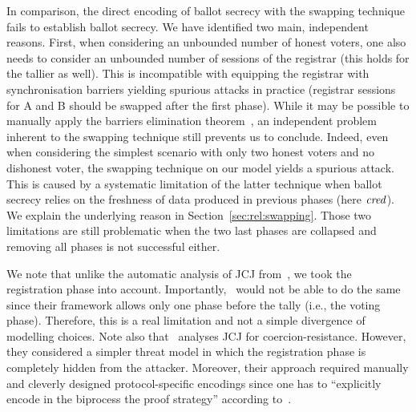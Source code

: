 In comparison, the direct encoding of ballot secrecy with the swapping technique~\cite{vote-CSF16} fails to establish ballot secrecy.
We have identified two main, independent reasons. 
First, when considering an unbounded number of honest voters, one also needs to consider an unbounded number of sessions of the registrar (this holds for the tallier as well).
This is incompatible with equipping the registrar with synchronisation
barriers %
yielding spurious attacks in practice (registrar sessions for A and B should be swapped after the first phase).
While it may be possible to manually apply the barriers elimination theorem~\cite{vote-CSF16}, an independent problem inherent to
the swapping technique still prevents us to conclude.
Indeed, even when considering the simplest scenario with only two honest voters and no dishonest voter,
the swapping technique on our model yields a spurious attack. This is caused by a systematic limitation of the latter technique when ballot secrecy relies
on the freshness of data produced in previous phases (here $\mathit{cred}$).
We explain the underlying reason in Section~\ref{sec:rel:swapping}. Those two limitations are still problematic
when the two last phases are collapsed and removing all phases is not successful either.

We note that unlike the automatic analysis of JCJ from~\cite{vote-ESO16}, we took the registration
phase into account. Importantly,~\cite{vote-ESO16} would not be able to
do the same since their framework allows only one phase before the tally
(i.e., the voting phase). Therefore, this is a real limitation and not a
simple divergence of modelling choices.
%
Note also that~\cite{vote-CSF08-maffei} analyses JCJ
for coercion-resistance. %
However, they considered a simpler threat model in which the registration
phase is completely hidden from the attacker.  Moreover, their approach required
manually and cleverly designed protocol-specific encodings
since one has to ``explicitly encode in the biprocess the proof strategy'' according to~\cite{vote-CSF08-maffei}.

